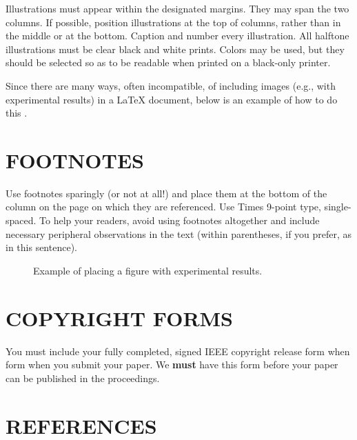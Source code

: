 \documentclass{article}
\begin{document}
Illustrations must appear within the designated margins.  They may span the two
columns.  If possible, position illustrations at the top of columns, rather
than in the middle or at the bottom.  Caption and number every illustration.
All halftone illustrations must be clear black and white prints.  Colors may be
used, but they should be selected so as to be readable when printed on a
black-only printer.

Since there are many ways, often incompatible, of including images (e.g., with
experimental results) in a LaTeX document, below is an example of how to do
this \cite{Lamp86}.

\section{FOOTNOTES}
\label{sec:foot}

Use footnotes sparingly (or not at all!) and place them at the bottom of the
column on the page on which they are referenced. Use Times 9-point type,
single-spaced. To help your readers, avoid using footnotes altogether and
include necessary peripheral observations in the text (within parentheses, if
you prefer, as in this sentence).

\begin{figure}[htb]


%
\caption{Example of placing a figure with experimental results.}
\label{fig:res}
%
\end{figure}



\section{COPYRIGHT FORMS}
\label{sec:copyright}

You must include your fully completed, signed IEEE copyright release form when
form when you submit your paper. We {\bf must} have this form before your paper
can be published in the proceedings.

\section{REFERENCES}
\label{sec:ref}
\end{document}
